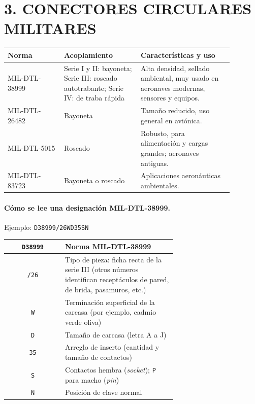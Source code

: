 \section*{3. CONECTORES CIRCULARES MILITARES}

\begin{center}
\small
\begin{tabular}{|p{0.22\linewidth}|p{0.30\linewidth}|p{0.36\linewidth}|}
\hline
\textbf{Norma} & \textbf{Acoplamiento} & \textbf{Características y uso} \\ \hline
MIL-DTL-38999 & Serie I y II: bayoneta; Serie III: roscado autotrabante; Serie IV: de traba
rápida & Alta densidad, sellado ambiental, muy usado en aeronaves modernas, sensores y equipos. \\
\hline
MIL-DTL-26482 & Bayoneta & Tamaño reducido, uso general en aviónica. \\ \hline
MIL-DTL-5015 & Roscado & Robusto, para alimentación y cargas grandes; aeronaves antiguas. \\
\hline
MIL-DTL-83723 & Bayoneta o roscado & Aplicaciones aeronáuticas ambientales. \\ \hline
\end{tabular}
\end{center}

\paragraph*{Cómo se lee una designación MIL-DTL-38999.} Ejemplo: \texttt{D38999/26WD35SN}
\begin{center}
\small
\begin{tabular}{|c|p{0.66\linewidth}|}
\hline
\texttt{D38999} & Norma MIL-DTL-38999 \\ \hline
\texttt{/26} & Tipo de pieza: ficha recta de la serie III (otros números identifican receptáculos de
pared, de brida, pasamuros, etc.) \\ \hline
\texttt{W} & Terminación superficial de la carcasa (por ejemplo, cadmio verde oliva) \\ \hline
\texttt{D} & Tamaño de carcasa (letra A a J) \\ \hline
\texttt{35} & Arreglo de inserto (cantidad y tamaño de contactos) \\ \hline
\texttt{S} & Contactos hembra (\textit{socket}); \texttt{P} para macho (\textit{pin}) \\ \hline
\texttt{N} & Posición de clave normal \\ \hline
\end{tabular}
\end{center}

